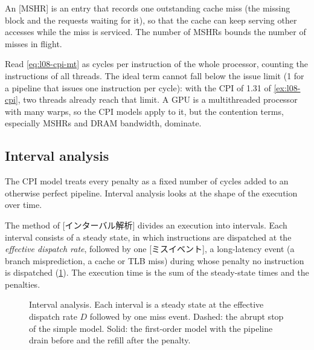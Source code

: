 \documentclass[../main.tex]{subfiles}
\begin{document}
\begin{definition}[MSHR]
  \label{def:l08-mshr}
  An [MSHR] is an entry
  that records one outstanding cache miss (the missing block and the
  requests waiting for it), so that the cache can keep serving other
  accesses while the miss is serviced.  The number of MSHRs bounds the
  number of misses in flight.
\end{definition}

\begin{note}
  \label{note:l08-cpi-mt}
  Read \eqref{eq:l08-cpi-mt} as cycles per instruction of the whole
  processor, counting the instructions of all threads.  The ideal term
  cannot fall below the issue limit (1 for a pipeline that issues one
  instruction per cycle): with the CPI of 1.31 of \cref{ex:l08-cpi},
  two threads already reach that limit.  A GPU is a multithreaded
  processor with many warps, so the CPI models apply to it, but the
  contention terms, especially MSHRs and DRAM bandwidth, dominate.
\end{note}

\subsection{Interval analysis}

The CPI model treats every penalty as a fixed number of cycles added to
an otherwise perfect pipeline.  Interval analysis looks at the shape of
the execution over time.

\begin{definition}
  \label{def:l08-interval}
  The method of [インターバル解析] divides an
  execution into intervals.  Each interval consists of a steady state, in which
  instructions are dispatched at the \emph{effective dispatch rate},
  followed by one [ミスイベント], a long-latency event
  (a branch misprediction, a cache or TLB miss) during whose penalty
  no instruction is dispatched (\cref{fig:l08-interval}).  The
  execution time is the sum of the steady-state times and the
  penalties.
\end{definition}

\begin{figure}[tb]
  \centering
  
  \caption{Interval analysis.  Each interval is a steady state at the
    effective dispatch rate $D$ followed by one miss event.  Dashed: the
    abrupt stop of the simple model.  Solid: the first-order model with
    the pipeline drain before and the refill after the penalty.}
  \label{fig:l08-interval}
\end{figure}
\end{document}

